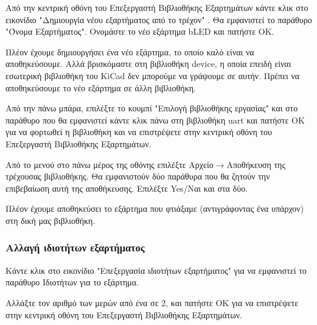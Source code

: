 \documentclass[a4paper]{article}
\begin{document}
Από την κεντρική οθόνη του Επεξεργαστή Βιβλιοθήκης Εξαρτημάτων κάντε κλικ στο εικονίδιο "Δημιουργία νέου εξαρτήματος από το τρέχον" %
. Θα εμφανιστεί το παράθυρο "Όνομα Εξαρτήματος". Ονομάστε το νέο εξάρτημα bLED και πατήστε ΟΚ.

\begin{figure}
  \begin{center}
    \label{fig:kicad-main}
  \end{center}
\end{figure}

Πλέον έχουμε δημιουργήσει ένα νέο εξάρτημα, το οποίο καλό είναι να αποθηκεύσουμε. Αλλά βρισκόμαστε στη βιβλιοθήκη device, η οποία επειδή είναι εσωτερική βιβλιοθήκη του KiCad δεν μπορούμε να γράψουμε σε αυτήν. Πρέπει να αποθηκεύσουμε το νέο εξάρτημα σε άλλη βιβλιοθήκη.

Από την πάνω μπάρα, επιλέξτε το κουμπί "Επιλογή βιβλιοθήκης εργασίας" %
 και στο παράθυρο που θα εμφανιστεί κάντε κλικ πάνω στη βιβλιοθήκη uart και πατήστε ΟΚ για να φορτωθεί η βιβλιοθήκη και να επιστρέψετε στην κεντρική οθόνη του Επεξεργαστή Βιβλιοθήκης Εξαρτημάτων.

Από το μενού στο πάνω μέρος της οθόνης επιλέξτε Αρχείο$\rightarrow$Αποθήκευση της τρέχουσας βιβλιοθήκης. Θα εμφανιστούν δύο παράθυρα που θα ζητούν την επιβεβαίωση αυτή της αποθήκευσης. Επιλέξτε Yes/Ναι και στα δύο.

Πλέον έχουμε αποθηκεύσει το εξάρτημα που φτιάξαμε (αντιγράφοντας ένα υπάρχον) στη δική μας βιβλιοθήκη.

\subsubsection{Αλλαγή ιδιοτήτων εξαρτήματος}
Κάντε κλικ στο εικονίδιο "Επεξεργασία ιδιοτήτων εξαρτήματος" %
για να εμφανιστεί το παράθυρο Ιδιοτήτων για το εξάρτημα. 

\begin{figure}
  \begin{center}
    \label{fig:kicad-main}
  \end{center}
\end{figure}

Αλλάξτε τον αριθμό των μερών από ένα σε 2, και πατήστε ΟΚ για να επιστρέψετε στην κεντρική οθόνη του Επεξεργαστή Βιβλιοθήκης Εξαρτημάτων.
\end{document}
